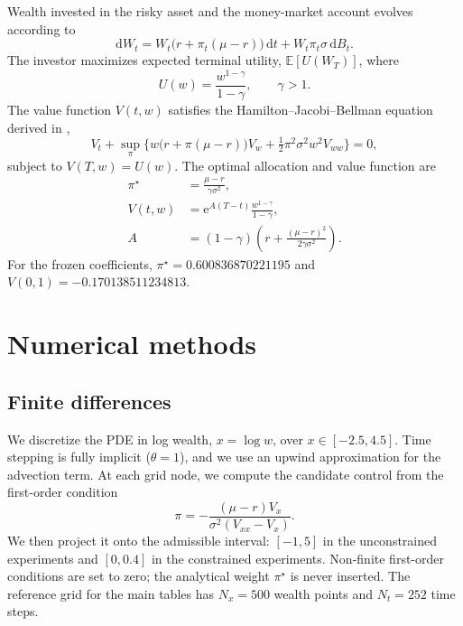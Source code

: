 \documentclass[11pt,a4paper]{article}
\newcommand{\E}{\mathbb{E}}
\begin{document}
Wealth invested in the risky asset and the money-market account evolves according to
\begin{equation}
\mathrm dW_t = W_t\big(r+\pi_t(\mu-r)\big)\,\mathrm dt + W_t\pi_t\sigma\,\mathrm dB_t.
\end{equation}
The investor maximizes expected terminal utility, $\E[U(W_T)]$, where
\begin{equation}
U(w)=\frac{w^{1-\gamma}}{1-\gamma}, \qquad \gamma>1.
\end{equation}
The value function $V(t,w)$ satisfies the Hamilton--Jacobi--Bellman equation derived in \citet{merton1969},
\begin{equation}
V_t + \sup_{\pi}\Big\{w\big(r+\pi(\mu-r)\big)V_w + \tfrac12 \pi^2\sigma^2 w^2 V_{ww}\Big\} = 0,
\end{equation}
subject to $V(T,w)=U(w)$. The optimal allocation and value function are
\begin{align}
\pi^{\star} &= \frac{\mu-r}{\gamma\sigma^2},\\
V(t,w) &= \mathrm e^{A(T-t)}\frac{w^{1-\gamma}}{1-\gamma},\\
A &= (1-\gamma)\left(r+\frac{(\mu-r)^2}{2\gamma\sigma^2}\right).
\end{align}
For the frozen coefficients, $\pi^{\star}=0.600836870221195$ and $V(0,1)=-0.170138511234813$.

\section{Numerical methods}
\label{sec:methods}

\subsection{Finite differences}

We discretize the PDE in log wealth, $x=\log w$, over $x\in[-2.5,4.5]$. Time stepping is fully implicit ($\theta=1$), and we use an upwind approximation for the advection term. At each grid node, we compute the candidate control from the first-order condition
\begin{equation}
\pi = -\frac{(\mu-r)V_x}{\sigma^2(V_{xx}-V_x)}.
\end{equation}
We then project it onto the admissible interval: $[-1,5]$ in the unconstrained experiments and $[0,0.4]$ in the constrained experiments. Non-finite first-order conditions are set to zero; the analytical weight $\pi^{\star}$ is never inserted. The reference grid for the main tables has $N_x=500$ wealth points and $N_t=252$ time steps.
\end{document}
